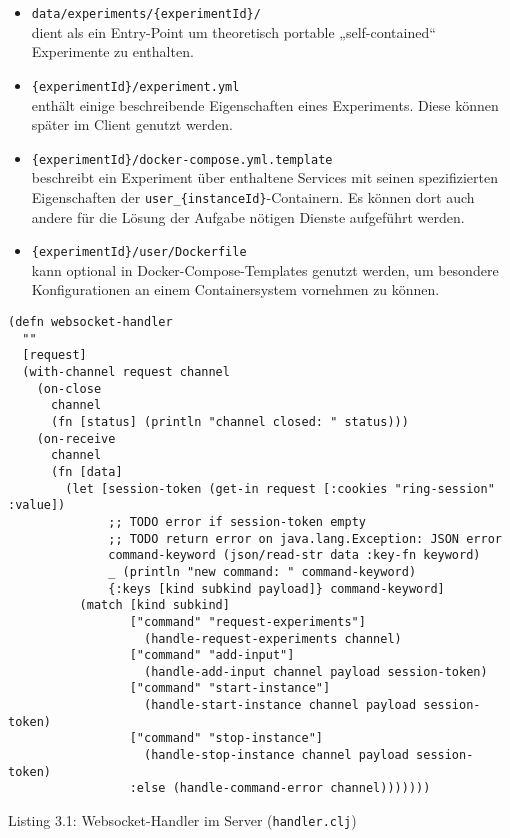 \begin{itemize}
  \item \texttt{data/experiments/\{experimentId\}/} \\dient als ein Entry-Point um theoretisch portable „self-contained“ Experimente zu enthalten.
  \item \texttt{\{experimentId\}/experiment.yml} \\enthält einige beschreibende Eigenschaften eines Experiments.
    Diese können später im Client genutzt werden.
  \item \texttt{\{experimentId\}/docker-compose.yml.template} \\beschreibt ein Experiment über enthaltene Services mit seinen spezifizierten Eigenschaften der \texttt{user_\{instanceId\}}-Containern.
    Es können dort auch andere für die Lösung der Aufgabe nötigen Dienste aufgeführt werden.
  \item \texttt{\{experimentId\}/user/Dockerfile} \\kann optional in Docker-Compose-Templates genutzt werden, um besondere Konfigurationen an einem Containersystem vornehmen zu können.
  \end{itemize}

\clearpage
\begin{verbatim}
(defn websocket-handler
  ""
  [request]
  (with-channel request channel
    (on-close
      channel
      (fn [status] (println "channel closed: " status)))
    (on-receive
      channel
      (fn [data]
        (let [session-token (get-in request [:cookies "ring-session" :value])
              ;; TODO error if session-token empty
              ;; TODO return error on java.lang.Exception: JSON error
              command-keyword (json/read-str data :key-fn keyword)
              _ (println "new command: " command-keyword)
              {:keys [kind subkind payload]} command-keyword]
          (match [kind subkind]
                 ["command" "request-experiments"]
                   (handle-request-experiments channel)
                 ["command" "add-input"]
                   (handle-add-input channel payload session-token)
                 ["command" "start-instance"]
                   (handle-start-instance channel payload session-token)
                 ["command" "stop-instance"]
                   (handle-stop-instance channel payload session-token)
                 :else (handle-command-error channel)))))))
\end{verbatim}
\begin{center}
  Listing 3.1: Websocket-Handler im Server (\texttt{handler.clj})
\end{center}
\clearpage

